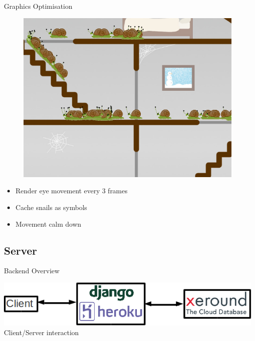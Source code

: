 \documentclass{beamer}
\begin{document}
\begin{frame}{Graphics Optimisation}
  \begin{figure}[Snails]
    \centering
    \includegraphics[scale=0.25]{SnailsScreenshot.png}
  \end{figure}
  \begin{itemize}
    \item Render eye movement every 3 frames
    \item Cache snails as symbols
    \item Movement calm down
  \end{itemize}
\end{frame}

\subsection{Server}

\begin{frame}{Backend Overview}
  \begin{center}
    \includegraphics[scale=0.4]{client_server_structure.png} \\
    Client/Server interaction
  \end{center}
\end{frame}
\end{document}
